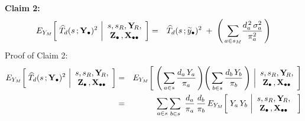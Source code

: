 \begin{enumerate}
    \vskip 0.5cm        
    \noindent
    \textbf{Claim 2:}\quad
    \begin{eqnarray*}
    E_{Y_{M}}\!\left[\;
        \widehat{T}_{d}(s\,;\mathbf{Y}_{\bullet})^{2}
        \,\left\vert
        \begin{array}{c}
            s,s_{R},\mathbf{Y}_{\!R}, \\ \mathbf{Z}_{\bullet}\,,\mathbf{X}_{\bullet\bullet}
            \end{array}
        \right.
        \!\right]
    & = &
        \widehat{T}_{d}(s\,;\widetilde{y}_{\bullet})^{2}
        \; + \;
        \left(\,
            \underset{a \in {\color{black}s_{M}}}{\sum}
            \dfrac{d_{a}^{\,2}\,\sigma^{2}_{a}}{\pi_{a}^{2}}
            \,\right)
    \end{eqnarray*}
    \vskip 0.1cm
    \noindent
    Proof of Claim 2:\;\;
    \begin{eqnarray*}
    E_{Y_{M}}\!\left[\;
        \widehat{T}_{d}(s\,;\Ydot)^{2}
        \,\left\vert
        \begin{array}{c}
            s,s_{R},\YsubR, \\ \Zdot\,,\Xobs
            \end{array}
        \right.
        \!\right]
    & = &
        E_{Y_{M}}\!\left[\;
            \left(\,
                \underset{a \in s}{\sum}\,\dfrac{d_{a}\,Y_{a}}{\pi_{a}}
                \,\right)
            \!
            \left(\,
                \underset{b \in s}{\sum}\,\dfrac{d_{b}\,Y_{b}}{\pi_{b}}
                \,\right)
            \,\left\vert
            \begin{array}{c}
                s,s_{R},\YsubR, \\ \Zdot\,,\Xobs
                \end{array}
            \right.
            \!\right]
    \\
    & = &
        \underset{a \in s}{\sum}\,
        \underset{b \in s}{\sum}\;\,
        \dfrac{d_{a}}{\pi_{a}}\,
        \dfrac{d_{b}}{\pi_{b}}\,
        E_{Y_{M}}\!\left[\;
            Y_{a}\,Y_{b}
            \,\left\vert
            \begin{array}{c}
                s,s_{R},\YsubR, \\ \Zdot\,,\Xobs
                \end{array}
            \right.
            \;\right]

\end{eqnarray*}
\end{enumerate}
